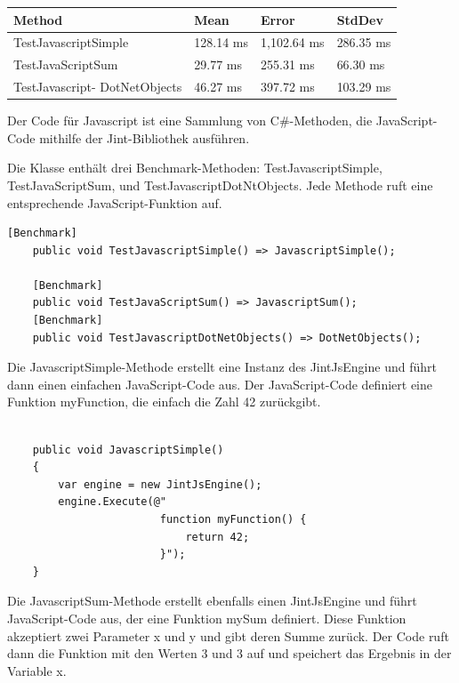      \begin{table}[H]
            \begin{tabular}{|p{3.5cm}|p{3cm}|p{3cm}|p{3cm}|}
            \hline
                Method & Mean & Error & StdDev \\ \hline
                TestJavascriptSimple & 128.14 ms & 1,102.64 ms & 286.35 ms  \\ \hline
                TestJavaScriptSum & 29.77 ms & 255.31 ms & 66.30 ms \\ \hline
                TestJavascript-
                DotNetObjects & 46.27 ms & 397.72 ms & 103.29 ms  \\ \hline
            \end{tabular}
        \end{table}

        Der Code für Javascript ist eine Sammlung von C\#-Methoden, die JavaScript-Code mithilfe der Jint-Bibliothek ausführen. 

Die Klasse enthält drei Benchmark-Methoden: TestJavascriptSimple, TestJavaScriptSum, und TestJavascriptDotNtObjects. Jede Methode ruft eine entsprechende JavaScript-Funktion auf.

\begin{lstlisting}[language={[Sharp]C}, caption=JavaScriptBenchmark, label=lst:imp:jsBench]
    [Benchmark]
    public void TestJavascriptSimple() => JavascriptSimple();

    [Benchmark]
    public void TestJavaScriptSum() => JavascriptSum();
    [Benchmark]
    public void TestJavascriptDotNetObjects() => DotNetObjects();
\end{lstlisting}

Die JavascriptSimple-Methode erstellt eine Instanz des JintJsEngine und führt dann einen einfachen JavaScript-Code aus. Der JavaScript-Code definiert eine Funktion myFunction, die einfach die Zahl 42 zurückgibt.
\begin{lstlisting}[language={[Sharp]C}, caption=JavascriptSimple, label=lst:imp:jsSimple]
    
    public void JavascriptSimple()
    {
        var engine = new JintJsEngine();           
        engine.Execute(@"
                        function myFunction() {
                            return 42;
                        }");           
    }
\end{lstlisting}

Die JavascriptSum-Methode erstellt ebenfalls einen JintJsEngine und führt JavaScript-Code aus, der eine Funktion mySum definiert. Diese Funktion akzeptiert zwei Parameter x und y und gibt deren Summe zurück. Der Code ruft dann die Funktion mit den Werten 3 und 3 auf und speichert das Ergebnis in der Variable x.

